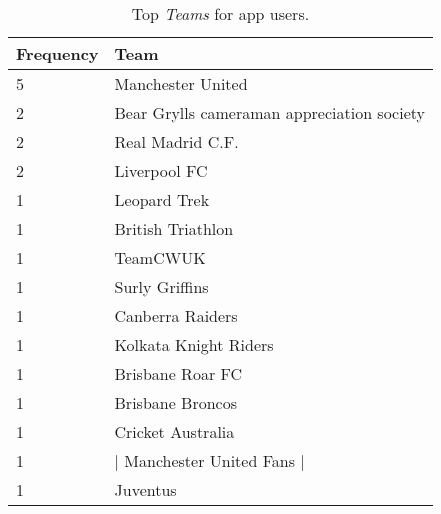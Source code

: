 \begin{table}[h]
\begin{minipage}[b]{1.0\textwidth}
\centering
  \begin{tabular}{|l|l|} %
  \hline
  	\textbf{Frequency} & \textbf{Team} \\ \hline
		5 & Manchester United \\ \hline
		2 & Bear Grylls cameraman appreciation society \\ \hline
		2 & Real Madrid C.F. \\ \hline
		2 & Liverpool FC \\ \hline
		1 & Leopard Trek \\ \hline
		1 & British Triathlon \\ \hline
		1 & TeamCWUK \\ \hline
		1 & Surly Griffins \\ \hline
		1 & Canberra Raiders \\ \hline
		1 & Kolkata Knight Riders \\ \hline
		1 & Brisbane Roar FC \\ \hline
		1 & Brisbane Broncos \\ \hline
		1 & Cricket Australia \\ \hline
		1 & | Manchester United Fans | \\ \hline
		1 & Juventus \\ \hline
  \end{tabular}
  \caption{Top \emph{Teams} for app users.}
\end{minipage}
\end{table}

